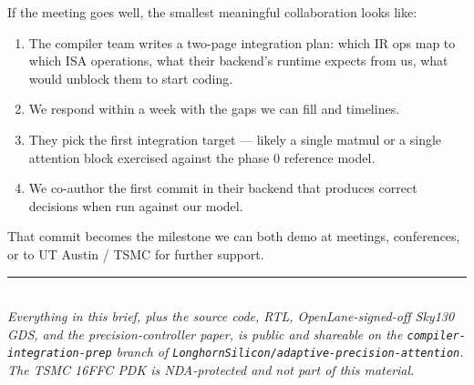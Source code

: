 \documentclass[11pt]{article}
\begin{document}
If the meeting goes well, the smallest meaningful collaboration looks like:
\begin{enumerate}
\item The compiler team writes a two-page integration plan: which IR ops
  map to which ISA operations, what their backend's runtime expects from
  us, what would unblock them to start coding.
\item We respond within a week with the gaps we can fill and timelines.
\item They pick the first integration target --- likely a single matmul or
  a single attention block exercised against the phase 0 reference model.
\item We co-author the first commit in their backend that produces correct
  decisions when run against our model.
\end{enumerate}

\noindent
That commit becomes the milestone we can both demo at meetings,
conferences, or to UT Austin / TSMC for further support.

\vspace{0.5em}
\noindent\rule{\textwidth}{0.4pt}\\
\noindent\small\textit{Everything in this brief, plus the source code,
RTL, OpenLane-signed-off Sky130 GDS, and the precision-controller paper, is
public and shareable on the \texttt{compiler-integration-prep} branch of
\texttt{LonghornSilicon/adaptive-precision-attention}. The TSMC 16FFC PDK
is NDA-protected and not part of this material.}
\end{document}
